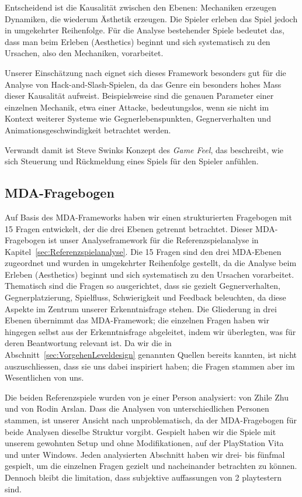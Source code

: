\documentclass[../Main.tex]{subfiles}
\begin{document}
Entscheidend ist die Kausalität zwischen den Ebenen: Mechaniken erzeugen Dynamiken, die wiederum Ästhetik erzeugen. Die Spieler erleben das Spiel jedoch in umgekehrter Reihenfolge.\autocite[\textcolor{red}{S.~??}]{hunicke2004mda} Für die Analyse bestehender Spiele bedeutet das, dass man beim Erleben (Aesthetics) beginnt und sich systematisch zu den Ursachen, also den Mechaniken, vorarbeitet.

Unserer Einschätzung nach eignet sich dieses Framework besonders gut für die Analyse von Hack-and-Slash-Spielen, da das Genre ein besonders hohes Mass dieser Kausalität aufweist. Beispielsweise sind die genauen Parameter einer einzelnen Mechanik, etwa einer Attacke, bedeutungslos, wenn sie nicht im Kontext weiterer Systeme wie Gegnerlebenspunkten, Gegnerverhalten und Animationsgeschwindigkeit betrachtet werden.

Verwandt damit ist Steve Swinks Konzept des \textit{Game Feel}, das beschreibt, wie sich Steuerung und Rückmeldung eines Spiels für den Spieler anfühlen.\autocite[1--6]{swink2008gamefeel}

\subsection{MDA-Fragebogen} \label{sec:Analysefragebogen}

Auf Basis des MDA-Frameworks haben wir einen strukturierten Fragebogen mit 15 Fragen entwickelt, der die drei Ebenen getrennt betrachtet. Dieser MDA-Fragebogen ist unser Analyseframework für die Referenzspielanalyse in Kapitel~\ref{sec:Referenzspielanalyse}. Die 15 Fragen sind den drei MDA-Ebenen zugeordnet und wurden in umgekehrter Reihenfolge gestellt, da die Analyse beim Erleben (Aesthetics) beginnt und sich systematisch zu den Ursachen vorarbeitet. Thematisch sind die Fragen so ausgerichtet, dass sie gezielt Gegnerverhalten, Gegnerplatzierung, Spielfluss, Schwierigkeit und Feedback beleuchten, da diese Aspekte im Zentrum unserer Erkenntnisfrage stehen. Die Gliederung in drei Ebenen übernimmt das MDA-Framework;\autocite{hunicke2004mda} die einzelnen Fragen haben wir hingegen selbst aus der Erkenntnisfrage abgeleitet, indem wir überlegten, was für deren Beantwortung relevant ist. Da wir die in Abschnitt~\ref{sec:VorgehenLeveldesign} genannten Quellen bereits kannten, ist nicht auszuschliessen, dass sie uns dabei inspiriert haben; die Fragen stammen aber im Wesentlichen von uns.

Die beiden Referenzspiele wurden von je einer Person analysiert:  von Zhile Zhu und  von Rodin Arslan. Dass die Analysen von unterschiedlichen Personen stammen, ist unserer Ansicht nach unproblematisch, da der MDA-Fragebogen für beide Analysen dieselbe Struktur vorgibt. Gespielt haben wir die Spiele mit unserem gewohnten Setup und ohne Modifikationen,  auf der PlayStation Vita und  unter Windows. Jeden analysierten Abschnitt haben wir drei- bis fünfmal gespielt, um die einzelnen Fragen gezielt und nacheinander betrachten zu können. Dennoch bleibt die limitation, dass subjektive auffassungen von 2 playtestern sind.
\end{document}

